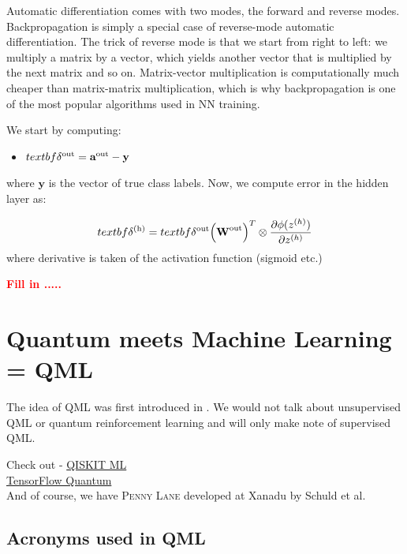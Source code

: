 \documentclass[11pt]{article}
\newcommand{\TODO}[1]{\textcolor{red}{\textbf{#1}}}
\begin{document}
Automatic differentiation comes with two modes, the forward and reverse modes.
Backpropagation is simply a special case of reverse-mode automatic differentiation.
The trick of reverse mode is that we start from right to left: we multiply a matrix by a vector, 
which yields another vector that is multiplied by the next matrix and so on. 
Matrix-vector multiplication is computationally much cheaper than matrix-matrix multiplication, 
which is why backpropagation is one of the most popular algorithms used in NN training.


We start by computing:

\begin{itemize}
\item $textbf \delta^{\rm{out}}  = \textbf{a}^{\rm{out}} - \textbf{y}$
\end{itemize}
where $\textbf{y}$ is the vector of true class labels. Now, we compute error in the hidden layer as:


\begin{equation}
textbf{\delta}^{\rm{(h)}} = textbf{\delta}^{\rm{out}} \Big( \textbf{W}^{\rm{out}}\Big)^{T} \otimes \frac{\partial \phi(z^{(h)})}{\partial z^{(h)}}  
\end{equation}
where derivative is taken of the activation function (sigmoid etc.)  



\TODO{Fill in .....} 




\section{Quantum meets Machine Learning = QML} 

The idea of QML was first introduced in \cite{2013arXiv1307.0411L}. 
We would not talk about unsupervised QML or quantum reinforcement learning and will only 
make note of supervised QML. 


Check out - \href{https://github.com/Qiskit/qiskit-machine-learning}{QISKIT ML}  \\ 
\href{https://github.com/tensorflow/quantum}{TensorFlow Quantum}  \cite{2020arXiv200302989B}  \\ 
And of course, we have \textsc{Penny Lane} developed at Xanadu by Schuld et al. 

\subsection{Acronyms used in QML} 
\end{document}
